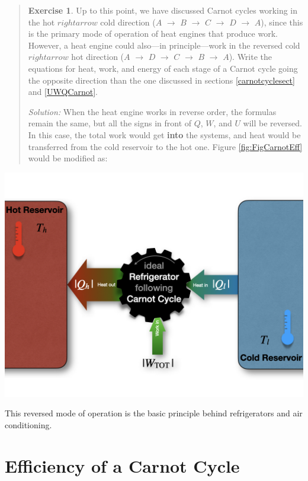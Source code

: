 \documentclass[
  9pt,
]{extbook}
\theoremstyle{definition}
\theoremstyle{definition}
\theoremstyle{definition}
\newtheorem{exercise}{Exercise}[chapter]
\theoremstyle{remark}
\begin{document}
\begin{quote}
\begin{exercise}
\protect\hypertarget{exr:CarnotEx}{}{\label{exr:CarnotEx} }Up to this point, we have discussed Carnot cycles working in the hot \(rightarrow\) cold direction (\(A\) \(\rightarrow\) \(B\) \(\rightarrow\) \(C\) \(\rightarrow\) \(D\) \(\rightarrow\) \(A\)), since this is the primary mode of operation of heat engines that produce work. However, a heat engine could also---in principle---work in the reversed cold \(rightarrow\) hot direction (\(A\) \(\rightarrow\) \(D\) \(\rightarrow\) \(C\) \(\rightarrow\) \(B\) \(\rightarrow\) \(A\)). Write the equations for heat, work, and energy of each stage of a Carnot cycle going the opposite direction than the one discussed in sections \ref{carnotcyclesect} and \ref{UWQCarnot}.

\emph{Solution:} When the heat engine works in reverse order, the formulas remain the same, but all the signs in front of \(Q\), \(W\), and \(U\) will be reversed. In this case, the total work would get \textbf{into} the systems, and heat would be transferred from the cold reservoir to the hot one. Figure \ref{fig:FigCarnotEff} would be modified as:
\end{exercise}
\end{quote}

\begin{flushright}\includegraphics[width=0.6\linewidth]{./img/OEP_Figures.010} \end{flushright}

This reversed mode of operation is the basic principle behind refrigerators and air conditioning.

\hypertarget{efficiency-of-a-carnot-cycle}{%
\section{Efficiency of a Carnot Cycle}\label{efficiency-of-a-carnot-cycle}}
\end{document}

